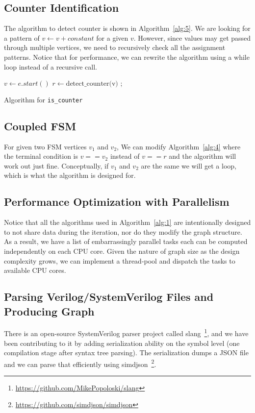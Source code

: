 \documentclass{article}
\begin{document}
\subsection{Counter Identification}
The algorithm to detect counter is shown in Algorithm~\ref{alg:5}. We are looking for a pattern of
$v \gets v + constant$ for a given $v$. However, since values may get passed through multiple
vertices, we need to recursively check all the assignment patterns. Notice that for performance,
we can rewrite the algorithm using a while loop instead of a recursive call.

\begin{algorithm}[htb]
    \label{alg:5}
     {
        $v \gets e.start()$\;
         {
             {
                \;
            }
        }
        $r \gets \text{detect\_counter(v)}$\;
         {
            ;
        }
    }
    \;
 \caption{Algorithm for \texttt{is\_counter}}
\end{algorithm}

\subsection{Coupled FSM}
For given two FSM vertices $v_1$ and $v_2$, We can modify Algorithm~\ref{alg:4} where the
terminal condition is $v == v_2$ instead of $v == r$ and the algorithm will work out just
fine. Conceptually, if $v_1$ and $v_2$ are the same we will get a loop, which is what the
algorithm is designed for.

\subsection{Performance Optimization with Parallelism}
Notice that all the algorithms used in Algorithm~\ref{alg:1} are intentionally designed to not
share data during the iteration, nor do they modify the graph structure. As a result, we have
a list of embarrassingly parallel tasks each can be computed independently on each CPU core.
Given the nature of graph size as the design complexity grows, we can implement a thread-pool
and dispatch the tasks to available CPU cores.

\subsection{Parsing Verilog/SystemVerilog Files and Producing Graph}
There is an open-source SystemVerilog parser project called
slang~\footnote{\url{https://github.com/MikePopoloski/slang}}, and we have been contributing
to it by adding serialization ability on the symbol level (one compilation stage after syntax
tree parsing). The serialization dumps a JSON file and we can parse that efficiently using
simdjson~\footnote{\url{https://github.com/simdjson/simdjson}}.
\end{document}
